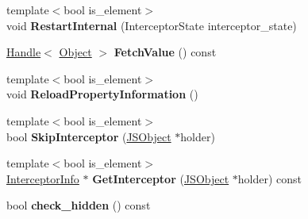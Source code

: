 \begin{DoxyCompactItemize}
\item 
{\footnotesize template$<$bool is\+\_\+element$>$ }\\void {\bfseries Restart\+Internal} (Interceptor\+State interceptor\+\_\+state)\hypertarget{classv8_1_1internal_1_1_b_a_s_e___e_m_b_e_d_d_e_d_ab35cd5535a30482842861540a2a25b5a}{}\label{classv8_1_1internal_1_1_b_a_s_e___e_m_b_e_d_d_e_d_ab35cd5535a30482842861540a2a25b5a}

\item 
\hyperlink{classv8_1_1internal_1_1_handle}{Handle}$<$ \hyperlink{classv8_1_1internal_1_1_object}{Object} $>$ {\bfseries Fetch\+Value} () const \hypertarget{classv8_1_1internal_1_1_b_a_s_e___e_m_b_e_d_d_e_d_a3d9da1b757e30c1ef6a92983a6a87479}{}\label{classv8_1_1internal_1_1_b_a_s_e___e_m_b_e_d_d_e_d_a3d9da1b757e30c1ef6a92983a6a87479}

\item 
{\footnotesize template$<$bool is\+\_\+element$>$ }\\void {\bfseries Reload\+Property\+Information} ()\hypertarget{classv8_1_1internal_1_1_b_a_s_e___e_m_b_e_d_d_e_d_a93dfe9a114f9a6268e94ad4b8b789b60}{}\label{classv8_1_1internal_1_1_b_a_s_e___e_m_b_e_d_d_e_d_a93dfe9a114f9a6268e94ad4b8b789b60}

\item 
{\footnotesize template$<$bool is\+\_\+element$>$ }\\bool {\bfseries Skip\+Interceptor} (\hyperlink{classv8_1_1internal_1_1_j_s_object}{J\+S\+Object} $\ast$holder)\hypertarget{classv8_1_1internal_1_1_b_a_s_e___e_m_b_e_d_d_e_d_abdb2810e3757ef3b63b5e185f9a10ed0}{}\label{classv8_1_1internal_1_1_b_a_s_e___e_m_b_e_d_d_e_d_abdb2810e3757ef3b63b5e185f9a10ed0}

\item 
{\footnotesize template$<$bool is\+\_\+element$>$ }\\\hyperlink{classv8_1_1internal_1_1_interceptor_info}{Interceptor\+Info} $\ast$ {\bfseries Get\+Interceptor} (\hyperlink{classv8_1_1internal_1_1_j_s_object}{J\+S\+Object} $\ast$holder) const \hypertarget{classv8_1_1internal_1_1_b_a_s_e___e_m_b_e_d_d_e_d_acf4065a0fb030f4e407232219feeb9f9}{}\label{classv8_1_1internal_1_1_b_a_s_e___e_m_b_e_d_d_e_d_acf4065a0fb030f4e407232219feeb9f9}

\item 
bool {\bfseries check\+\_\+hidden} () const \hypertarget{classv8_1_1internal_1_1_b_a_s_e___e_m_b_e_d_d_e_d_a57b09bae102d7ef8520d15a52e8283e2}{}\label{classv8_1_1internal_1_1_b_a_s_e___e_m_b_e_d_d_e_d_a57b09bae102d7ef8520d15a52e8283e2}


\end{DoxyCompactItemize}
